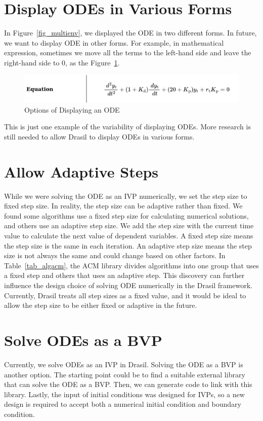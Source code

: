 \section{Display ODEs in Various Forms}
In Figure~\ref{fig_multienv}, we displayed the ODE in two different forms. In future, we want to display ODE in other forms. For example, in mathematical expression, sometimes we move all the terms to the left-hand side and leave the right-hand side to 0, as the Figure~\ref{fig_odevariousform}.
\begin{figure}[ht]
\centering	
\includegraphics[width=1\textwidth]{figures/ODEVariousForm.png}
\caption{Options of Displaying an ODE}
\label{fig_odevariousform}
\end{figure}
This is just one example of the variability of displaying ODEs. More research is still needed to allow Drasil to display ODEs in various forms.

\section{Allow Adaptive Steps}
While we were solving the ODE as an IVP numerically, we set the step size to fixed step size. In reality, the step size can be adaptive rather than fixed. We found some algorithms use a fixed step size for calculating numerical solutions, and others use an adaptive step size. We add the step size with the current time value to calculate the next value of dependent variables. A fixed step size means the step size is the same in each iteration. An adaptive step size means the step size is not always the same and could change based on other factors. In Table~\ref{tab_algacm}, the ACM library divides algorithms into one group that uses a fixed step and others that uses an adaptive step. This discovery can further influence the design choice of solving ODE numerically in the Drasil framework. Currently, Drasil treats all step sizes as a fixed value, and it would be ideal to allow the step size to be either fixed or adaptive in the future.

\section{Solve ODEs as a BVP}
Currently, we solve ODEs as an IVP in Drasil. Solving the ODE as a BVP is another option. The starting point could be to find a suitable external library that can solve the ODE as a BVP. Then, we can generate code to link with this library. Lastly, the input of initial conditions was designed for IVPs, so a new design is required to accept both a numerical initial condition and boundary condition.

